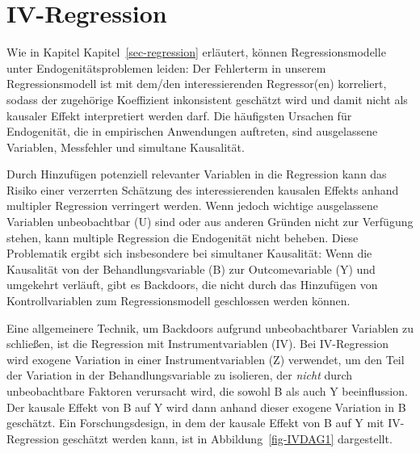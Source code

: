 \documentclass[
  a4paper,
  DIV=11,
  oneside]{scrreprt}
\begin{document}

\chapter{IV-Regression}\label{sec-IV}

Wie in Kapitel Kapitel~\ref{sec-regression} erläutert, können
Regressionsmodelle unter Endogenitätsproblemen leiden: Der Fehlerterm in
unserem Regressionsmodell ist mit dem/den interessierenden Regressor(en)
korreliert, sodass der zugehörige Koeffizient inkonsistent geschätzt
wird und damit nicht als kausaler Effekt interpretiert werden darf. Die
häufigsten Ursachen für Endogenität, die in empirischen Anwendungen
auftreten, sind ausgelassene Variablen, Messfehler und simultane
Kausalität.

Durch Hinzufügen potenziell relevanter Variablen in die Regression kann
das Risiko einer verzerrten Schätzung des interessierenden kausalen
Effekts anhand multipler Regression verringert werden. Wenn jedoch
wichtige ausgelassene Variablen unbeobachtbar (U) sind oder aus anderen
Gründen nicht zur Verfügung stehen, kann multiple Regression die
Endogenität nicht beheben. Diese Problematik ergibt sich insbesondere
bei simultaner Kausalität: Wenn die Kausalität von der
Behandlungsvariable (B) zur Outcomevariable (Y) und umgekehrt verläuft,
gibt es Backdoors, die nicht durch das Hinzufügen von Kontrollvariablen
zum Regressionsmodell geschlossen werden können.

Eine allgemeinere Technik, um Backdoors aufgrund unbeobachtbarer
Variablen zu schließen, ist die Regression mit Instrumentvariablen (IV).
Bei IV-Regression wird exogene Variation in einer Instrumentvariablen
(Z) verwendet, um den Teil der Variation in der Behandlungsvariable zu
isolieren, der \emph{nicht} durch unbeobachtbare Faktoren verursacht
wird, die sowohl B als auch Y beeinflussion. Der kausale Effekt von B
auf Y wird dann anhand dieser exogene Variation in B geschätzt. Ein
Forschungsdesign, in dem der kausale Effekt von B auf Y mit
IV-Regression geschätzt werden kann, ist in Abbildung~\ref{fig-IVDAG1}
dargestellt.
\end{document}
